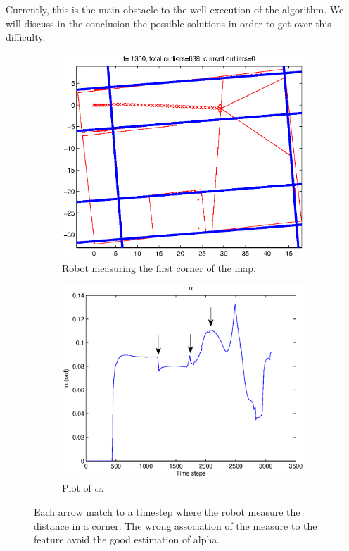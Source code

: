 \documentclass[a4paper,12pt]{article}
\begin{document}
Currently, this is the main obstacle to the well execution of the algorithm.
We will discuss in the conclusion the possible solutions in order to get over this difficulty.

\begin{figure}

        \begin{subfigure}[t]{0.45\textwidth}
                \includegraphics[width=\textwidth]{alpha_trouble_map}
                \caption{Robot measuring the first corner of the map.}
        \end{subfigure}
        \quad
        \begin{subfigure}[t]{0.45\textwidth}
                \includegraphics[width=\textwidth]{alpha_trouble}
                \caption{Plot of $\alpha$.}
        \end{subfigure}
	\caption{Each arrow match to a timestep where the robot measure the distance in a corner. The wrong association of the measure to the feature avoid the good estimation of alpha.}
	\label{fig:alpha_trouble}
\end{figure}
\end{document}
